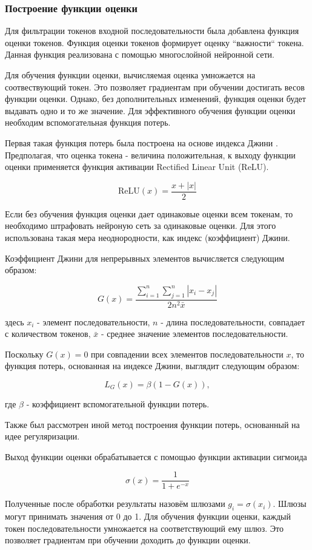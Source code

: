 \subsubsection{Построение функции оценки}
Для фильтрации токенов входной последовательности была добавлена функция оценки токенов. Функция оценки токенов формирует оценку ``важности`` токена. Данная функция реализована с помощью многослойной нейронной сети.

Для обучения функции оценки, вычисляемая оценка умножается на соотвествующий токен. Это позволяет градиентам при обучении достигать весов функции оценки. Однако, без дополнительных изменений, функция оценки будет выдавать одно и то же значение. Для эффективного обучения функции оценки необходим вспомогательная функция потерь.

Первая такая функция потерь была построена на основе индекса Джини \cite{gini}. Предполагая, что оценка токена - величина положительная, к выходу функции оценки применяется функция активации Rectified Linear Unit (ReLU). 

$$
\text{ReLU}(x) = \dfrac{x + |x|}{2}
$$

Если без обучения функция оценки дает одинаковые оценки всем токенам, то необходимо штрафовать нейроную сеть за одинаковые оценки. Для этого использована такая мера неоднородности, как индекс (коэффициент) Джини.

Коэффициент Джини для непрерывных элементов вычисляется следующим образом:

$$
G(x) = \dfrac{\sum\limits_{i=1}^n\sum\limits_{j=1}^n|x_i - x_j|}{2n^2\bar x}
$$

здесь $x_i$ - элемент последовательности, $n$ - длина последовательности, совпадает с количеством токенов, $\bar x$ - среднее значение элементов последовательности.

Поскольку $G(x) = 0$ при совпадении всех элементов последовательности $x$, то функция потерь, основанная на индексе Джини, выглядит следующим образом:

$$
L_G(x) = \beta(1 - G(x)),
$$

где $\beta$ - коэффициент вспомогательной функции потерь.

Также был рассмотрен иной метод построения функции потерь, основанный на идее регуляризации.

Выход функции оценки обрабатывается с помощью функции активации сигмоида

$$
\sigma(x) = \dfrac{1}{1 + e^{-x}}
$$

Полученные после обработки результаты назовём шлюзами $g_i = \sigma(x_i)$. Шлюзы могут принимать значения от 0 до 1. Для обучения функции оценки, каждый токен последовательности умножается на соответствующий ему шлюз. Это позволяет градиентам при обучении доходить до функции оценки. 

